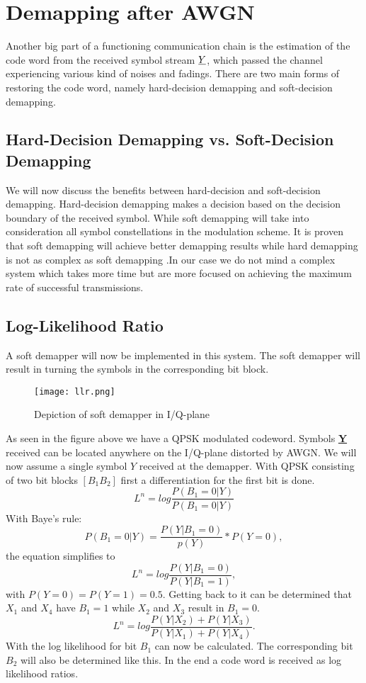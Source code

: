 \section{Demapping after AWGN}
Another big part of a functioning communication chain is the estimation of the code word from the received symbol stream $\boldmath\underline{Y}$, which passed the channel experiencing various kind of noises and fadings. There are two main forms of restoring the code word, namely hard-decision demapping and soft-decision demapping.
\subsection{Hard-Decision Demapping vs. Soft-Decision Demapping}
We will now discuss the benefits between hard-decision and soft-decision demapping. Hard-decision demapping makes a decision based on the decision boundary of the received symbol. While soft demapping will take into consideration all symbol constellations in the modulation scheme.
It is proven that soft demapping will achieve better demapping results while hard demapping is not as complex as soft demapping \cite{GaussianWaves}.In our case we do not mind a complex system which takes more time but are more focused on achieving the maximum rate of successful transmissions.
\newpage
\subsection{Log-Likelihood Ratio}
A soft demapper will now be implemented in this system. The soft demapper will result in turning the symbols in the corresponding bit block.
\begin{figure}[!htb]
    \centering
    \texttt{[image: llr.png]}
    \caption{Depiction of soft demapper in I/Q-plane}
    \label{fig:llr}
\end{figure}
\newline
As seen in the figure above we have a \gls{QPSK} modulated codeword. Symbols \textbf{\underline{Y}} received can be located anywhere on the I/Q-plane distorted by AWGN. We will now assume a single symbol $Y$ received at the demapper.
With QPSK consisting of two bit blocks $[B_1B_2]$ first a differentiation for the first bit is done.
\begin{equation}
\label{eq:llr1}
L^n = log\frac{P(B_1=0|Y)}{P(B_1=0|Y)}
\end{equation}
With Baye's rule:
\begin{equation}
\label{eq:bl}
P(B_1=0|Y) = \frac{P(Y|B_1=0)}{p(Y)}*P(Y=0),
\end{equation}
the equation simplifies to 
\begin{equation}
L^n = log\frac{P(Y|B_1=0)}{P(Y|B_1=1)},
\end{equation}
with $P(Y=0)=P(Y=1)=0.5$.
Getting back to  it can be determined that $X_1$ and $X_4$ have $B_1=1$ while $X_2$ and $X_3$ result in $B_1=0$.
\begin{equation}
L^n = log\frac{P(Y|X_2)+P(Y|X_3)}{P(Y|X_1)+P(Y|X_4)}.
\end{equation}
With  the log likelihood for bit $B_1$ can now be calculated. The corresponding bit $B_2$ will also be determined like this. In the end a code word is received as log likelihood ratios\cite{SoftDemapping}.
